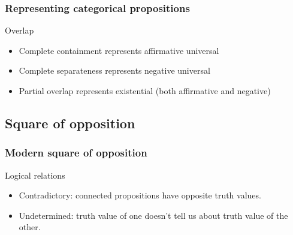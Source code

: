 \documentclass[10pt,letterpaper,xcolor=dvipsnames,handout]{beamer}
\begin{document}
\begin{frame}
  \frametitle{Representing categorical propositions}

\begin{block}{Overlap}
  \begin{itemize}
    \item<2-> Complete containment represents affirmative universal
    \item<3-> Complete separateness represents negative universal
    \item<4-> Partial overlap represents existential (both affirmative and negative)
  \end{itemize}
\end{block}


\end{frame}

\subsection{Square of opposition}

\begin{frame}
  \frametitle{Modern square of opposition}

  \begin{block}{Logical relations}
    \begin{itemize}
      \item<2-> Contradictory: connected propositions have opposite truth values.
      \item<3-> Undetermined: truth value of one doesn't tell us about truth value of the other.
    \end{itemize}
  \end{block}
    
  \begin{center}
  \end{center}
  
\end{frame}
\end{document}
